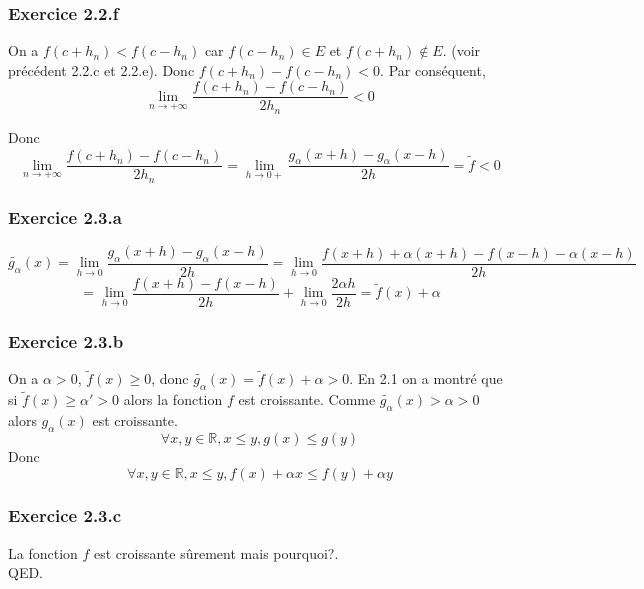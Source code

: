 \documentclass[]{book}
\theoremstyle{definition}
\newcommand{\bb}[1]{\mathbb{#1}}
\newcommand{\R}{\bb{R}}
\begin{document}
\subsubsection*{Exercice 2.2.f}
On a $f(c+h_n) < f(c-h_n)$ car $f(c-h_n) \in E$ et $f(c+h_n) \notin E$. (voir pr\'ec\'edent 2.2.c et 2.2.e). Donc $f(c+h_n)- f(c-h_n) < 0$. Par cons\'equent, 
$$\lim_{n \to +\infty} \frac{f(c+h_n)- f(c-h_n)}{2h_n} < 0$$

Donc
$$ \lim_{n \to +\infty} \frac{f(c+h_n)- f(c-h_n)}{2h_n} =
\lim_{h \to 0+} \frac{g_\alpha(x+h)- g_\alpha(x-h)}{2h} = \tilde{f} < 0$$


\subsubsection*{Exercice 2.3.a}
$$\tilde{g_\alpha}(x) = \lim_{h \to 0} \frac{g_\alpha(x+h)- g_\alpha(x-h)}{2h} = \lim_{h \to 0} \frac{f(x+h) + \alpha (x+h)  - f(x-h) - \alpha (x-h)}{2h}$$
$$=\lim_{h \to 0} \frac{f(x+h) - f(x-h)}{2h} + \lim_{h \to 0} \frac{2 \alpha h}{2h} = \tilde{f}(x) + \alpha$$

\subsubsection*{Exercice 2.3.b}
On a $\alpha > 0$, $\tilde{f}(x) \geq 0$, donc  $\tilde{g_\alpha}(x) = \tilde{f}(x) + \alpha > 0$. En 2.1 on a montr\'e que si $\tilde{f}(x) \geq \alpha' > 0$ alors la fonction $f$ est croissante. Comme $\tilde{g_\alpha}(x) > \alpha > 0$ alors $g_{\alpha}(x)$ est croissante. 
$$\forall x, y \in \R, x \leq y, g(x) \leq g(y)$$
Donc
$$\forall x, y \in \R, x \leq y, f(x) + \alpha x \leq f(y) + \alpha y$$

\subsubsection*{Exercice 2.3.c}

La fonction $f	$ est croissante s\^urement mais pourquoi?.\\

QED.
\end{document}
